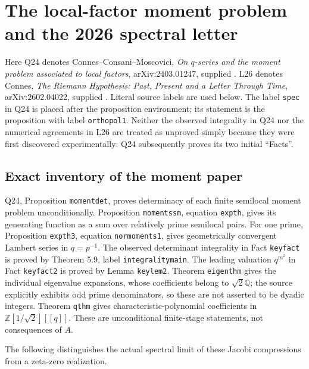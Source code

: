 \section{The local-factor moment problem and the 2026 spectral letter}
\label{sec:ACspectralfollowup}

Here Q24 denotes Connes--Consani--Moscovici, \emph{On \(q\)-series and
the moment problem associated to local factors}, arXiv:2403.01247, supplied
.
L26 denotes Connes, \emph{The Riemann Hypothesis: Past, Present and a
Letter Through Time}, arXiv:2602.04022, supplied
.
Literal source labels are used below.  The label \texttt{spec} in Q24
is placed after the proposition environment; its statement is the
proposition with label \texttt{orthopol1}.  Neither the observed
integrality in Q24 nor the numerical agreements in L26 are treated as
unproved simply because they were first discovered experimentally:
Q24 subsequently proves its two initial ``Facts''.

\subsection{Exact inventory of the moment paper}

Q24, Proposition \texttt{momentdet}, proves determinacy of each finite
semilocal moment problem unconditionally.  Proposition
\texttt{momentssm}, equation \texttt{expth}, gives its generating
function as a sum over relatively prime semilocal pairs.  For one
prime, Proposition \texttt{expth3}, equation \texttt{normoments1},
gives geometrically convergent Lambert series in \(q=p^{-1}\).
The observed determinant integrality in Fact \texttt{keyfact} is
proved by Theorem 5.9, label \texttt{integralitymain}.  The leading
valuation \(q^{m^2}\) in Fact \texttt{keyfact2} is proved by Lemma
\texttt{keylem2}.  Theorem \texttt{eigenthm} gives the individual
eigenvalue expansions, whose coefficients belong to
\(\sqrt2\mathbb Q\); the source explicitly exhibits odd prime
denominators, so these are not asserted to be dyadic integers.
Theorem \texttt{qthm} gives characteristic-polynomial coefficients in
\(\mathbb Z[1/\sqrt2][[q]]\).  These are unconditional finite-stage
statements, not consequences of \(A\).

The following distinguishes the actual spectral limit of these Jacobi
compressions from a zeta-zero realization.

